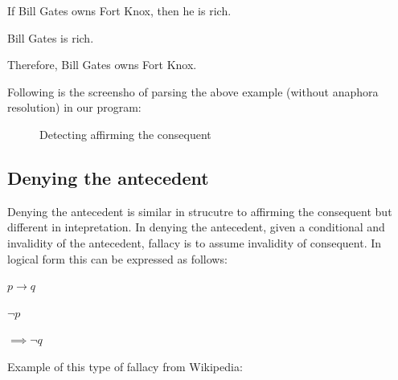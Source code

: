 \documentclass[14pt, english]{article}
\begin{document}
\begin{center}
If Bill Gates owns Fort Knox, then he is rich.
\par\end{center}

\begin{center}
Bill Gates is rich.
\par\end{center}

\begin{center}
Therefore, Bill Gates owns Fort Knox.
\par\end{center}

Following is the screensho of parsing the above example (without anaphora
resolution) in our program:

\begin{figure}[htp]
 \caption{Detecting affirming the consequent} \end{figure}


\subsection{Denying the antecedent}

Denying the antecedent is similar in strucutre to affirming the consequent
but different in intepretation. In denying the antecedent, given a
conditional and invalidity of the antecedent, fallacy is to assume
invalidity of consequent. In logical form this can be expressed as
follows:

\begin{center}
$p\to q$
\par\end{center}

\begin{center}
$\neg p$
\par\end{center}

\begin{center}
$\implies\neg q$
\par\end{center}

Example of this type of fallacy from Wikipedia: 
\end{document}
